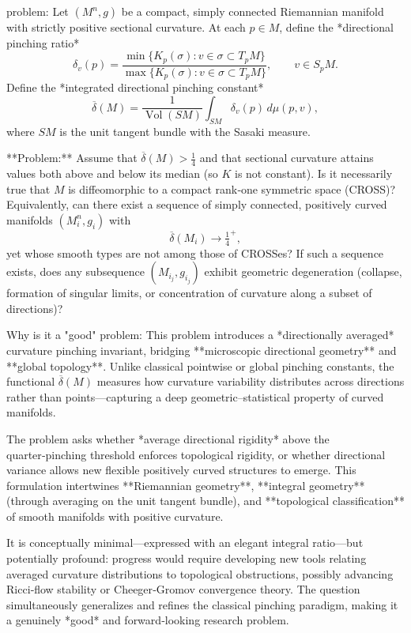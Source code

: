 problem:  
Let \( (M^n,g) \) be a compact, simply connected Riemannian manifold with strictly positive sectional curvature.  
At each \(p\in M\), define the *directional pinching ratio*  
\[
\delta_v(p)=\frac{\min\{K_p(\sigma): v\in \sigma\subset T_pM\}}{\max\{K_p(\sigma): v\in \sigma\subset T_pM\}},\qquad v\in S_pM.
\]
Define the *integrated directional pinching constant*  
\[
\overline{\delta}(M)=\frac{1}{\operatorname{Vol}(SM)}\int_{SM}\delta_v(p)\,d\mu(p,v),
\]
where \(SM\) is the unit tangent bundle with the Sasaki measure.  

**Problem:**  
Assume that \(\overline{\delta}(M)>\tfrac{1}{4}\) and that sectional curvature attains values both above and below its median (so \(K\) is not constant).   
Is it necessarily true that \(M\) is diffeomorphic to a compact rank‑one symmetric space (CROSS)?  
Equivalently, can there exist a sequence of simply connected, positively curved manifolds \((M_i^n,g_i)\) with  
\[
\overline{\delta}(M_i)\to\tfrac{1}{4}^+,
\]
yet whose smooth types are not among those of CROSSes?  
If such a sequence exists, does any subsequence \( (M_{i_j},g_{i_j}) \) exhibit geometric degeneration (collapse, formation of singular limits, or concentration of curvature along a subset of directions)?

Why is it a "good" problem:  
This problem introduces a *directionally averaged* curvature pinching invariant, bridging **microscopic directional geometry** and **global topology**. Unlike classical pointwise or global pinching constants, the functional \(\overline{\delta}(M)\) measures how curvature variability distributes across directions rather than points—capturing a deep geometric–statistical property of curved manifolds.  

The problem asks whether *average directional rigidity* above the quarter‑pinching threshold enforces topological rigidity, or whether directional variance allows new flexible positively curved structures to emerge. This formulation intertwines **Riemannian geometry**, **integral geometry** (through averaging on the unit tangent bundle), and **topological classification** of smooth manifolds with positive curvature.  

It is conceptually minimal—expressed with an elegant integral ratio—but potentially profound: progress would require developing new tools relating averaged curvature distributions to topological obstructions, possibly advancing Ricci‑flow stability or Cheeger‑Gromov convergence theory. The question simultaneously generalizes and refines the classical pinching paradigm, making it a genuinely *good* and forward‑looking research problem.